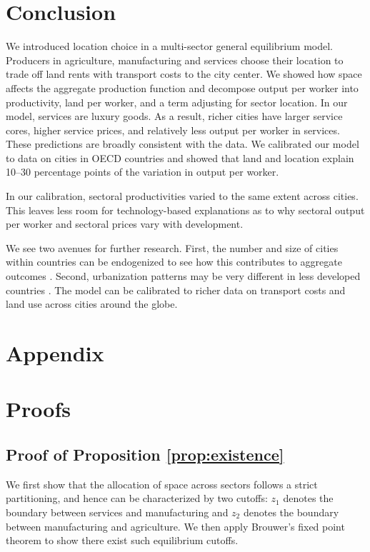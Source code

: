 \documentclass[12pt]{article}
\begin{document}
\section{Conclusion}
We introduced location choice in a multi-sector general equilibrium model. Producers in agriculture, manufacturing and services choose their location to trade off land rents with transport costs to the city center. We showed how space affects the aggregate production function and decompose output per worker into productivity, land per worker, and a term adjusting for sector location. In our model, services are luxury goods. As a result, richer cities have larger service cores, higher service prices, and relatively less output per worker in services. These predictions are broadly consistent with the data. We calibrated our model to data on cities in OECD countries and showed that land and location explain 10--30 percentage points of the variation in output per worker.

In our calibration, sectoral productivities varied to the same extent across cities. This leaves less room for technology-based explanations as to why sectoral output per worker and sectoral prices vary with development. 

We see two avenues for further research. First, the number and size of cities within countries can be endogenized to see how this contributes to aggregate outcomes \cite{Desmet2013,Ramondo2016-qy}. Second, urbanization patterns may be very different in less developed countries \cite{Glaeser2014-gd,Harari2016-cx}. The model can be calibrated to richer data on transport costs and land use across cities around the globe.
\clearpage




\clearpage

\appendix
\section*{Appendix}
\section{Proofs}
\subsection{Proof of Proposition \ref{prop:existence}}
We first show that the allocation of space across sectors follows a strict partitioning, and hence can be characterized by two cutoffs: $z_1$ denotes the boundary between services and manufacturing and $z_2$ denotes the boundary between manufacturing and agriculture. We then apply Brouwer's fixed point theorem to show there exist such equilibrium cutoffs.
\end{document}
